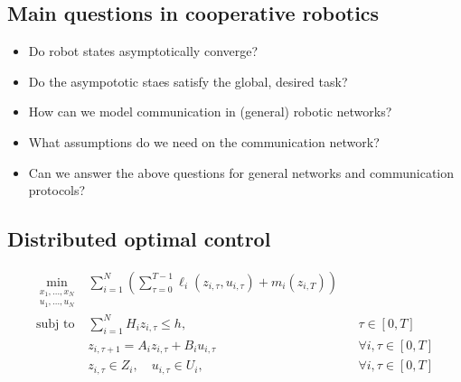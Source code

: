 \documentclass{book}
\theoremstyle{definition}
\theoremstyle{remark}
\theoremstyle{remark}
\theoremstyle{definition}
\begin{document}
\subsection{Main questions in cooperative robotics}
\begin{itemize}
    \item Do robot states asymptotically converge? 
    \item Do the asympototic staes satisfy the global, desired task?
    \item How can we model communication in (general) robotic networks?
    \item What assumptions do we need on the communication network?
    \item Can we answer the above questions for general networks and communication protocols?
\end{itemize}
\subsection{Distributed optimal control}
\begin{align*}
    \min_{\substack{x_1,\dots,x_N \\ u_1,\dots,u_N}} & \displaystyle\sum_{i=1}^{N}(\displaystyle\sum_{\tau=0}^{T-1}\ell_i(z_{i,\tau},u_{i,\tau})+m_i(z_{i,T}))\\
    \text{subj to} & \displaystyle\sum_{i=1}^{N}H_iz_{i,\tau}\leq h, && \tau\in[0,T]\\ 
    & z_{i,\tau+1}=A_iz_{i,\tau}+B_iu_{i,\tau} && \forall i, \tau \in [0,T]\\ 
    & z_{i,\tau}\in Z_i, \quad u_{i,\tau}\in U_i, && \forall i, \tau \in [0,T]\\ 
\end{align*}
\end{document}
